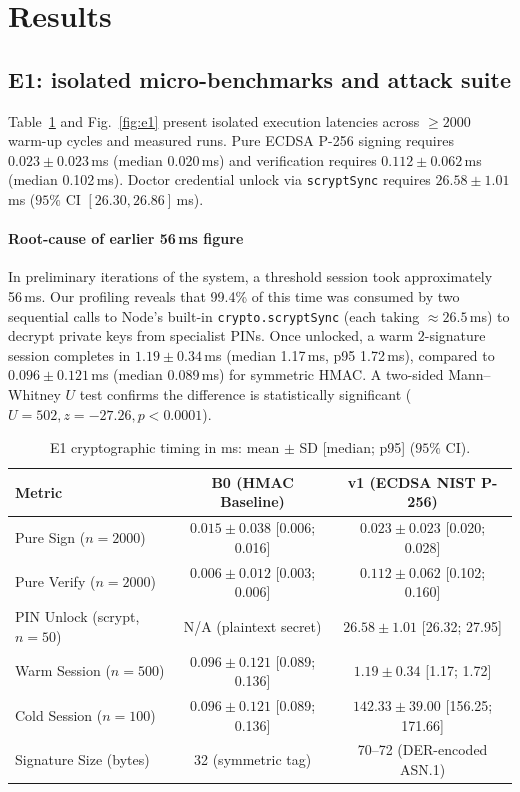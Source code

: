 \documentclass[journal]{IEEEtran}
\begin{document}
\section{Results}\label{sec:results}

\subsection{E1: isolated micro-benchmarks and attack suite}
Table~\ref{tab:e1} and Fig.~\ref{fig:e1} present isolated execution latencies across
$\ge2000$ warm-up cycles and measured runs. Pure ECDSA P-256 signing requires
$0.023\pm0.023$\,ms (median 0.020\,ms) and verification requires $0.112\pm0.062$\,ms
(median 0.102\,ms). Doctor credential unlock via \texttt{scryptSync} requires
$26.58\pm1.01$\,ms ($95\%$ CI $[26.30, 26.86]$\,ms).

\paragraph*{Root-cause of earlier 56\,ms figure} In preliminary iterations of the
system, a threshold session took approximately 56\,ms. Our profiling reveals
that 99.4\% of this time was consumed by two sequential calls to Node's built-in
\texttt{crypto.scryptSync} (each taking $\approx26.5$\,ms) to decrypt private keys
from specialist PINs. Once unlocked, a warm $2$-signature session completes in
$1.19\pm0.34$\,ms (median 1.17\,ms, p95 1.72\,ms), compared to $0.096\pm0.121$\,ms
(median 0.089\,ms) for symmetric HMAC. A two-sided Mann--Whitney $U$ test confirms
the difference is statistically significant ($U=502, z=-27.26, p < 0.0001$).

\begin{table}[t]
\centering
\caption{E1 cryptographic timing in ms: mean $\pm$ SD [median; p95] ($95\%$ CI).}
\label{tab:e1}
\scriptsize
\setlength{\tabcolsep}{2pt}
\begin{tabular}{@{}lcc@{}}
\toprule
Metric & B0 (HMAC Baseline) & v1 (ECDSA NIST P-256) \\
\midrule
Pure Sign ($n=2000$) & $0.015\pm0.038$ [0.006; 0.016] & $0.023\pm0.023$ [0.020; 0.028] \\
Pure Verify ($n=2000$) & $0.006\pm0.012$ [0.003; 0.006] & $0.112\pm0.062$ [0.102; 0.160] \\
PIN Unlock (scrypt, $n=50$) & N/A (plaintext secret) & $26.58\pm1.01$ [26.32; 27.95] \\
Warm Session ($n=500$) & $0.096\pm0.121$ [0.089; 0.136] & $1.19\pm0.34$ [1.17; 1.72] \\
Cold Session ($n=100$) & $0.096\pm0.121$ [0.089; 0.136] & $142.33\pm39.00$ [156.25; 171.66] \\
Signature Size (bytes) & 32 (symmetric tag) & 70--72 (DER-encoded ASN.1) \\
\bottomrule
\end{tabular}
\end{table}
\end{document}
